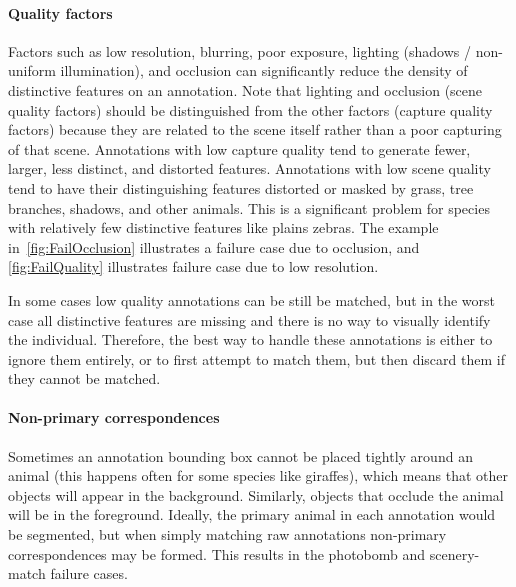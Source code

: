         \paragraph{Quality factors}
            Factors such as low resolution, blurring, poor exposure, lighting (shadows / non-uniform illumination),
            and occlusion can significantly reduce the density of distinctive features on an annotation. Note that
            lighting and occlusion (scene quality factors) should be distinguished from the other factors (capture
            quality factors) because they are related to the scene itself rather than a poor capturing of that
            scene. Annotations with low capture quality tend to generate fewer, larger, less distinct, and
            distorted features. Annotations with low scene quality tend to have their distinguishing features
            distorted or masked by grass, tree branches, shadows, and other animals. This is a significant problem
            for species with relatively few distinctive features like plains zebras. The example
            in~\cref{fig:FailOcclusion} illustrates a failure case due to occlusion, and \cref{fig:FailQuality}
            illustrates failure case due to low resolution.

            In some cases low quality annotations can be still be matched, but in the worst case all distinctive
            features are missing and there is no way to visually identify the individual. Therefore, the best way
            to handle these annotations is either to ignore them entirely, or to first attempt to match them, but
            then discard them if they cannot be matched.

            \FailOcclusion{}
            \FailQuality{}

        \FloatBarrier{}
          \paragraph{Non-primary correspondences}
            Sometimes an annotation bounding box cannot be placed tightly around an animal (this happens often for
            some species like giraffes), which means that other objects will appear in the background. Similarly,
            objects that occlude the animal will be in the foreground. Ideally, the primary animal in each
            annotation would be segmented, but when simply matching raw annotations non-primary correspondences may
            be formed. This results in the photobomb and scenery-match failure cases.

